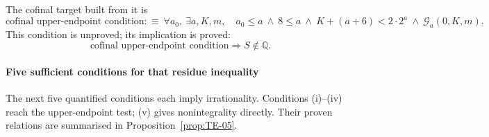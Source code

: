 The cofinal target built from it is
\[
  \text{cofinal upper-endpoint condition} :\equiv\
  \forall a_0,\ \exists a,K,m,\quad
  a_0\le a\ \wedge\ 8\le a\ \wedge\ K+(a{+}6)<2\cdot 2^a\ \wedge\
  \mathcal G_a(0,K,m).
\]
This condition is unproved; its implication is proved:
\[
  \text{cofinal upper-endpoint condition} \Longrightarrow S\notin\mathbb Q.
\]

\paragraph{Five sufficient conditions for that residue inequality}
The next five quantified conditions each imply irrationality. Conditions
(i)--(iv) reach the upper-endpoint test; (v) gives nonintegrality directly.
Their proven relations are summarised in Proposition~\ref{prop:TE-05}.

